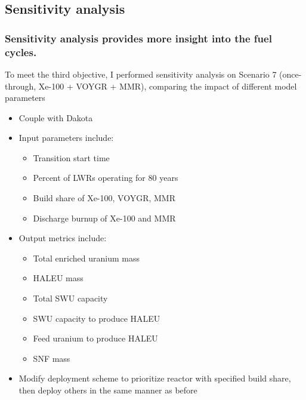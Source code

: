 \subsection{Sensitivity analysis}
\begin{frame}
    \frametitle{Sensitivity analysis provides more insight into 
    the fuel cycles.}
    To meet the third objective, I performed sensitivity analysis 
    on Scenario 7 (once-through, Xe-100 + VOYGR + MMR), 
    comparing the impact of different model parameters
    \begin{itemize}
        \item Couple \Cyclus with Dakota \cite{adams_dakota_2021}
        \item<2-> Input parameters include:
        \begin{itemize}
            \item<2-> Transition start time
            \item<2-> Percent of \glspl{LWR} operating for 80 years
            \item<2-> Build share of Xe-100, VOYGR, MMR
            \item<2-> Discharge burnup of Xe-100 and MMR
        \end{itemize}
        \item<3-> Output metrics include:
        \begin{itemize}
            \item<3-> Total enriched uranium mass
            \item<3-> HALEU mass
            \item<3-> Total SWU capacity
            \item<3-> SWU capacity to produce HALEU
            \item<3-> Feed uranium to produce HALEU
            \item<3-> \gls{SNF} mass
        \end{itemize}
        \item<4-> Modify deployment scheme to prioritize reactor with 
              specified build share, then deploy others in the same 
              manner as before
    \end{itemize}

\end{frame}

